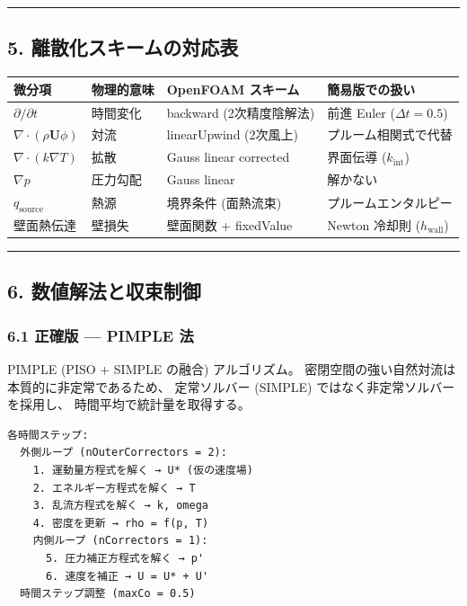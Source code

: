 \documentclass[a4paper,11pt]{article}
\begin{document}
\bigskip\hrule\bigskip

\subsection{5. 離散化スキームの対応表}

{\small
\noindent
\begin{tabularx}{\textwidth}{|l|L|L|L|}
\hline
\textbf{微分項} & \textbf{物理的意味} & \textbf{OpenFOAM スキーム} & \textbf{簡易版での扱い} \\
\hline
$\partial/\partial t$ & 時間変化 & backward (2次精度陰解法) & 前進 Euler ($\Delta t = 0.5$) \\
\hline
$\nabla \cdot (\rho \mathbf{U} \phi)$ & 対流 & linearUpwind (2次風上) & プルーム相関式で代替 \\
\hline
$\nabla \cdot (k \nabla T)$ & 拡散 & Gauss linear corrected & 界面伝導 ($k_{\text{int}}$) \\
\hline
$\nabla p$ & 圧力勾配 & Gauss linear & 解かない \\
\hline
$q_{\text{source}}$ & 熱源 & 境界条件 (面熱流束) & プルームエンタルピー \\
\hline
壁面熱伝達 & 壁損失 & 壁面関数 + fixedValue & Newton 冷却則 ($h_{\text{wall}}$) \\
\hline
\end{tabularx}
}


\bigskip\hrule\bigskip

\subsection{6. 数値解法と収束制御}

\subsubsection{6.1 正確版 — PIMPLE 法}

PIMPLE (PISO + SIMPLE の融合) アルゴリズム。
密閉空間の強い自然対流は本質的に非定常であるため、
定常ソルバー (SIMPLE) ではなく非定常ソルバーを採用し、
時間平均で統計量を取得する。

\begin{verbatim}
各時間ステップ:
  外側ループ (nOuterCorrectors = 2):
    1. 運動量方程式を解く → U* (仮の速度場)
    2. エネルギー方程式を解く → T
    3. 乱流方程式を解く → k, omega
    4. 密度を更新 → rho = f(p, T)
    内側ループ (nCorrectors = 1):
      5. 圧力補正方程式を解く → p'
      6. 速度を補正 → U = U* + U'
  時間ステップ調整 (maxCo = 0.5)
\end{verbatim}
\end{document}
